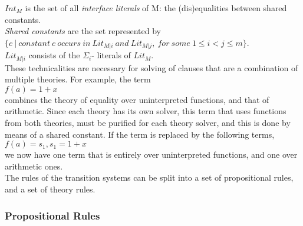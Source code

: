 \documentclass{article}
\begin{document}
$Int_M$ is the set of all \textit{interface literals} of M:
the (dis)equalities between shared constants. \\
\textit{Shared constants} are the set represented by \\
$\{c\ |\ constant\ c\ occurs\ in\ Lit_{M|i}\ and\ Lit_{M|j},\ 
for\ some\ 1 \leq i < j \leq m\}$. \\
$Lit_{M|i}$ consists of the $\Sigma_i$- literals of $Lit_M$. \\
These technicalities are necessary for solving of clauses 
that are a combination of multiple theories. 
For example, the term \\
$f(a) = 1 + x$ \\
combines the theory of equality over uninterpreted functions,
and that of arithmetic. Since each theory has its own solver,
this term that uses functions from both theories, must be 
purified for each theory solver, and this is done by means of
a shared constant. If the term is replaced by the following 
terms, \\
$f(a) = s_1, s_1 = 1 + x$ \\
we now have one term that is entirely over uninterpreted 
functions, and one over arithmetic ones. \\

The rules of the transition systems can be split into a 
set of propositional rules, and a set of theory rules. 

\subsubsection{Propositional Rules}
	\label{sec:proprules}
	
\end{document}
